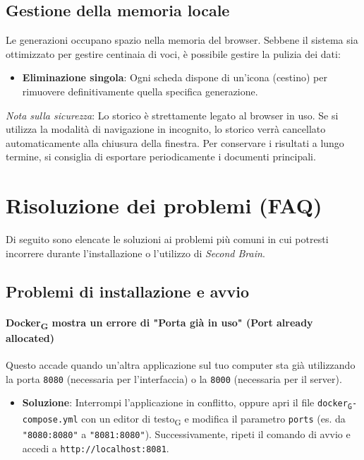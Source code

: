 \documentclass[11pt,a4paper]{article}
\newcommand{\gls}[1]{#1\textsubscript{G}}
\begin{document}

\subsection{Gestione della memoria locale}
Le generazioni occupano spazio nella memoria del browser. Sebbene il sistema sia ottimizzato per gestire centinaia di voci, è possibile gestire la pulizia dei dati:
\begin{itemize}
    \item \textbf{Eliminazione singola}: Ogni scheda dispone di un'icona (cestino) per rimuovere definitivamente quella specifica generazione.
\end{itemize}

\textit{Nota sulla sicurezza}: Lo storico è strettamente legato al browser in uso. Se si utilizza la modalità di navigazione in incognito, lo storico verrà cancellato automaticamente alla chiusura della finestra. Per conservare i risultati a lungo termine, si consiglia di esportare periodicamente i documenti principali.


\newpage
\section{Risoluzione dei problemi (FAQ)}
Di seguito sono elencate le soluzioni ai problemi più comuni in cui potresti incorrere durante l'installazione o l'utilizzo di \textit{Second Brain}.

\subsection{Problemi di installazione e avvio}

\paragraph{\gls{Docker} mostra un errore di "Porta già in uso" (Port already allocated)}
Questo accade quando un'altra applicazione sul tuo computer sta già utilizzando la porta \texttt{8080} (necessaria per l'interfaccia) o la \texttt{8000} (necessaria per il server).
\begin{itemize}
    \item \textbf{Soluzione}: Interrompi l'applicazione in conflitto, oppure apri il file \texttt{\gls{docker}-compose.yml} con un \gls{editor di testo} e modifica il parametro \texttt{ports} (es. da \texttt{"8080:8080"} a \texttt{"8081:8080"}). Successivamente, ripeti il comando di avvio e accedi a \texttt{http://localhost:8081}.
\end{itemize}
\end{document}
